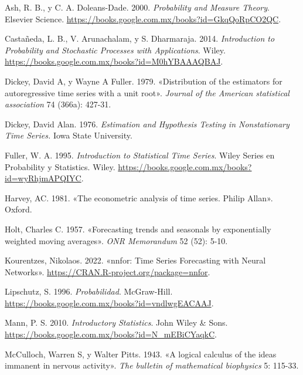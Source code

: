 \documentclass[
  us-letterpaper,
]{scrreprt}
\newlength{\cslhangindent}
\newenvironment{CSLReferences}[2] %
 {\begin{list}{}{%
  \setlength{\itemindent}{0pt}
  \setlength{\leftmargin}{0pt}
  \setlength{\parsep}{0pt}
  \ifodd #1
   \setlength{\leftmargin}{\cslhangindent}
   \setlength{\itemindent}{-1\cslhangindent}
  \fi
  \setlength{\itemsep}{#2\baselineskip}}}
 {\end{list}}
\theoremstyle{definition}
\theoremstyle{plain}
\theoremstyle{plain}
\theoremstyle{definition}
\theoremstyle{remark}
\begin{document}
\label{refs}
\begin{CSLReferences}{1}{0}
Ash, R. B., y C. A. Doleans-Dade. 2000. \emph{Probability and Measure
Theory}. Elsevier Science.
\url{https://books.google.com.mx/books?id=GkqQoRpCO2QC}.

Castañeda, L. B., V. Arunachalam, y S. Dharmaraja. 2014.
\emph{Introduction to Probability and Stochastic Processes with
Applications}. Wiley.
\url{https://books.google.com.mx/books?id=M0hYBAAAQBAJ}.

Dickey, David A, y Wayne A Fuller. 1979. {«Distribution of the
estimators for autoregressive time series with a unit root»}.
\emph{Journal of the American statistical association} 74 (366a):
427-31.

Dickey, David Alan. 1976. \emph{Estimation and Hypothesis Testing in
Nonstationary Time Series.} Iowa State University.

Fuller, W. A. 1995. \emph{Introduction to Statistical Time Series}.
Wiley Series en Probability y Statistics. Wiley.
\url{https://books.google.com.mx/books?id=wyRhjmAPQIYC}.

Harvey, AC. 1981. {«The econometric analysis of time series. Philip
Allan»}. Oxford.

Holt, Charles C. 1957. {«Forecasting trends and seasonals by
exponentially weighted moving averages»}. \emph{ONR Memorandum} 52 (52):
5-10.

Kourentzes, Nikolaos. 2022. {«nnfor: Time Series Forecasting with Neural
Networks»}. \url{https://CRAN.R-project.org/package=nnfor}.

Lipschutz, S. 1996. \emph{Probabilidad}. McGraw-Hill.
\url{https://books.google.com.mx/books?id=vndlwgEACAAJ}.

Mann, P. S. 2010. \emph{Introductory Statistics}. John Wiley \& Sons.
\url{https://books.google.com.mx/books?id=N_mEBiCYaqkC}.

McCulloch, Warren S, y Walter Pitts. 1943. {«A logical calculus of the
ideas immanent in nervous activity»}. \emph{The bulletin of mathematical
biophysics} 5: 115-33.


\end{CSLReferences}
\end{document}
